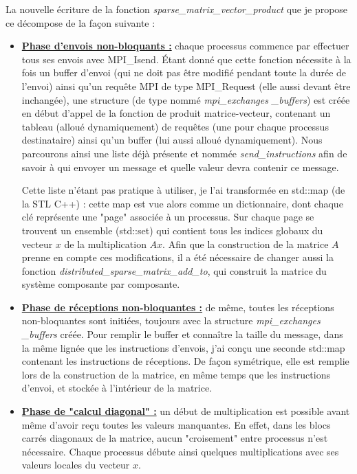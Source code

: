 \documentclass[11pt,a4paper,oneside]{memoir}
\theoremstyle{definition}
\theoremstyle{remark}
\theoremstyle{plain}
\begin{document}
La nouvelle écriture de la fonction \textit{sparse\_matrix\_vector\_product} que je propose ce décompose de la façon suivante :\medskip
\begin{itemize}
\item \textbf{\underline{Phase d'envois non-bloquants :}} chaque processus commence par effectuer tous ses envois avec MPI\_Isend. \'Etant donné que cette fonction nécessite à la fois un buffer d'envoi (qui ne doit pas être modifié pendant toute la durée de l'envoi) ainsi qu'un requête MPI de type MPI\_Request (elle aussi devant être inchangée), une structure (de type nommé \textit{mpi\_exchanges \_buffers}) est créée en début d'appel de la fonction de produit matrice-vecteur, contenant un tableau (alloué dynamiquement) de requêtes (une pour chaque processus destinataire) ainsi qu'un buffer (lui aussi alloué dynamiquement). Nous parcourons ainsi une liste déjà présente et nommée \textit{send\_instructions} afin de savoir à qui envoyer un message et quelle valeur devra contenir ce message.

Cette liste n'étant pas pratique à utiliser, je l'ai transformée en std::map (de la STL C++) : cette map est vue alors comme un dictionnaire, dont chaque clé représente une "page" associée à un processus. Sur chaque page se trouvent un ensemble (std::set) qui contient tous les indices globaux du vecteur $x$ de la multiplication $Ax$. Afin que la construction de la matrice $A$ prenne en compte ces modifications, il a été nécessaire de changer aussi la fonction \textit{distributed\_sparse\_matrix\_add\_to}, qui construit la matrice du système composante par composante.\medskip

\item \textbf{\underline{Phase de réceptions non-bloquantes :}} de même, toutes les réceptions non-bloquantes sont initiées, toujours avec la structure \textit{mpi\_exchanges \_buffers} créée. Pour remplir le buffer et connaître la taille du message, dans la même lignée que les instructions d'envois, j'ai conçu une seconde std::map contenant les instructions de réceptions. De façon symétrique, elle est remplie lors de la construction de la matrice, en même temps que les instructions d'envoi, et stockée à l'intérieur de la matrice.

\item \textbf{\underline{Phase de "calcul diagonal" :}} un début de multiplication est possible avant même d'avoir reçu toutes les valeurs manquantes. En effet, dans les blocs carrés diagonaux de la matrice, aucun "croisement" entre processus n'est nécessaire. Chaque processus débute ainsi quelques multiplications avec ses valeurs locales du vecteur $x$.\medskip


\end{itemize}
\end{document}
